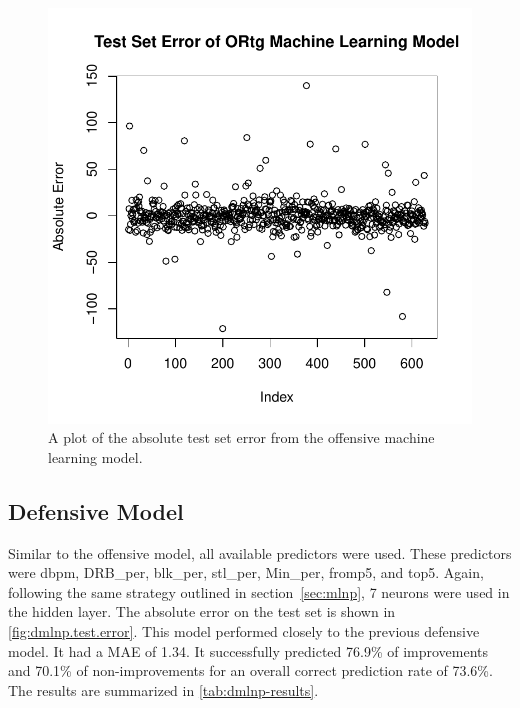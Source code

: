 \documentclass[12pt]{article}
\begin{document}
\begin{figure}[tbp]
	\centering
	\includegraphics[width=\textwidth]{omlnp.test.error}
	\caption{A plot of the absolute test set error from the offensive machine learning model.}
	\label{fig:omlnp.test.error}
\end{figure}

\begin{table}[tbp]
\caption{Offensive Neural Network Model Evaluators}
\centering
{}
\label{tab:omlnp-results}
\end{table}

\subsection{Defensive Model}
\label{subsec:dmlnp}
Similar to the offensive model, all available predictors were used. These predictors were dbpm, DRB\_per, blk\_per, stl\_per, Min\_per, fromp5, and top5. Again, following the same strategy outlined in section~\ref{sec:mlnp}, 7 neurons were used in the hidden layer. The absolute error on the test set is shown in \autoref{fig:dmlnp.test.error}. This model performed  closely to the previous defensive model. It had a MAE of 1.34. It successfully predicted 76.9\% of improvements and 70.1\% of non-improvements for an overall correct prediction rate of 73.6\%.  The results are summarized in \autoref{tab:dmlnp-results}.
\end{document}
